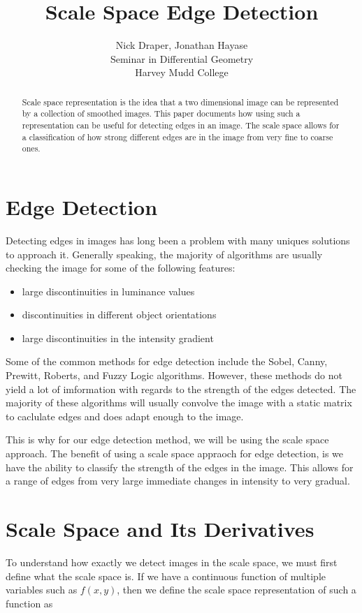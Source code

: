 \documentclass{article}
\title{Scale Space Edge Detection}
\author{
  Nick Draper, Jonathan Hayase\\
  Seminar in Differential Geometry\\
  Harvey Mudd College
}
\begin{document}
\maketitle

\begin{abstract}
    Scale space representation is the idea that a two dimensional image can be represented by a collection of smoothed images. This paper documents how using such a representation can be useful for detecting edges in an image. The scale space allows for a classification of how strong different edges are in the image from very fine to coarse ones. 
\end{abstract}

\section{Edge Detection}
    Detecting edges in images has long been a problem with many uniques solutions to approach it. Generally speaking, the majority of algorithms are usually checking the image for some of the following features:

    \begin{itemize}
        \item large discontinuities in luminance values
        \item discontinuities in different object orientations
        \item large discontinuities in the intensity gradient
    \end{itemize}

    \indent Some of the common methods for edge detection include the Sobel, Canny, Prewitt, Roberts, and Fuzzy Logic algorithms. However, these methods do not yield a lot of imformation with regards to the strength of the edges detected. The majority of these algorithms will usually convolve the image with a static matrix to caclulate edges and does adapt enough to the image. 

    This is why for our edge detection method, we will be using the scale space approach. The benefit of using a scale space appraoch for edge detection, is we have the ability to classify the strength of the edges in the image. This allows for a range of edges from very large immediate changes in intensity to very gradual. 

\section{Scale Space and Its Derivatives}
    To understand how exactly we detect images in the scale space, we must first define what the scale space is. If we have a continuous function of multiple variables such as $f(x,y)$, then we define the scale space representation of such a function as 
\end{document}

